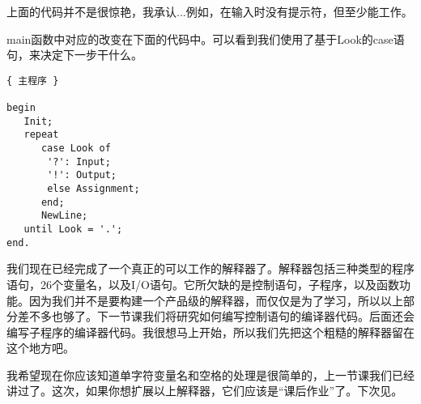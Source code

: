 上面的代码并不是很惊艳，我承认...例如，在输入时没有提示符，但至少能工作。

main函数中对应的改变在下面的代码中。可以看到我们使用了基于Look的case语句，来决定下一步干什么。

\begin{verbatim}
{ 主程序 }

begin
   Init;
   repeat
      case Look of
       '?': Input;
       '!': Output;
       else Assignment;
      end;
      NewLine;
   until Look = '.';
end.
\end{verbatim}

我们现在已经完成了一个真正的可以工作的解释器了。解释器包括三种类型的程序语句，26个变量名，以及I/O语句。它所欠缺的是控制语句，子程序，以及函数功能。因为我们并不是要构建一个产品级的解释器，而仅仅是为了学习，所以以上部分差不多也够了。下一节课我们将研究如何编写控制语句的编译器代码。后面还会编写子程序的编译器代码。我很想马上开始，所以我们先把这个粗糙的解释器留在这个地方吧。

我希望现在你应该知道单字符变量名和空格的处理是很简单的，上一节课我们已经讲过了。这次，如果你想扩展以上解释器，它们应该是“课后作业”了。下次见。
